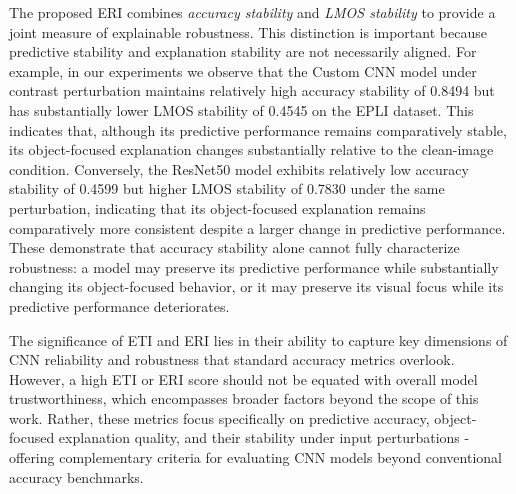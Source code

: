 \documentclass[a4paper,fleqn]{cas-dc}
\begin{document}
	The proposed ERI combines \emph{accuracy stability} and \emph{LMOS stability} to provide a joint measure of explainable robustness. 
	This distinction is important because predictive stability and explanation stability are not necessarily aligned. 
	For example, in our experiments we observe that the Custom CNN 
    model under contrast perturbation maintains relatively high accuracy stability of 0.8494 but has substantially lower LMOS stability of 0.4545 on the EPLI dataset. 
	This indicates that, although its predictive performance remains comparatively stable, its object-focused explanation changes substantially relative to the clean-image condition. 
	Conversely, the ResNet50 model exhibits relatively low accuracy stability of 0.4599 but higher LMOS stability of 0.7830 under the same perturbation, indicating that its object-focused explanation remains comparatively more consistent despite a larger change in predictive performance. 
	These demonstrate that accuracy stability alone cannot fully characterize robustness: a model may preserve its predictive performance while substantially changing its object-focused behavior, or it may preserve its visual focus while its predictive performance deteriorates. 
	
	
	The significance of ETI and ERI lies in their ability to capture key dimensions of CNN reliability and robustness that standard accuracy metrics overlook. 
	However, a high ETI or ERI score should not be equated with overall model trustworthiness, which encompasses broader factors beyond the scope of this work. 
	Rather, these metrics focus specifically on predictive accuracy, object-focused explanation quality, and their stability under input perturbations - offering complementary criteria for evaluating CNN models beyond conventional accuracy benchmarks.
	
\end{document}
